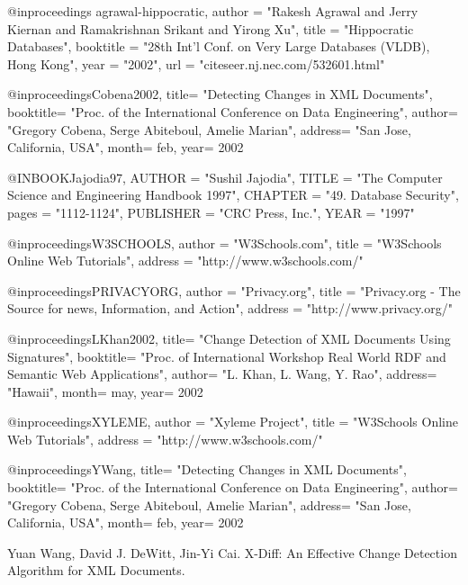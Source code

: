 
%
%

@inproceedings{ agrawal-hippocratic,
  author = "Rakesh Agrawal and Jerry Kiernan and Ramakrishnan Srikant and Yirong Xu",
  title = "Hippocratic Databases",
  booktitle = "28th Int'l Conf. on Very Large Databases (VLDB), Hong Kong",
  year = "2002",
  url = "citeseer.nj.nec.com/532601.html" }


@inproceedings{Cobena2002,
    title=          "Detecting Changes in XML Documents",
    booktitle=      "Proc. of the International Conference on Data Engineering",
    author=         "Gregory Cobena, Serge Abiteboul, Amelie Marian",
    address=        "San Jose, California, USA",
    month=          feb,
    year=           2002
}


@INBOOK{Jajodia97,
  AUTHOR =       "Sushil Jajodia",
  TITLE =        "The Computer Science and Engineering Handbook 1997",
  CHAPTER =      "49. Database Security",
  pages =        "1112-1124",
  PUBLISHER =    "CRC Press, Inc.",
  YEAR =         "1997"
}

@inproceedings{W3SCHOOLS,
    author = "W3Schools.com",
    title = "W3Schools Online Web Tutorials",
    address = "http://www.w3schools.com/"
}

@inproceedings{PRIVACYORG,
    author = "Privacy.org",
    title = "Privacy.org - The Source for news, Information, and Action",
    address = "http://www.privacy.org/"
}


@inproceedings{LKhan2002,
    title=          "Change Detection of XML Documents Using Signatures",
    booktitle=      "Proc. of International Workshop Real World RDF and Semantic Web Applications",
    author=         "L. Khan, L. Wang, Y. Rao",
    address=        "Hawaii",
    month=          may,
    year=           2002
}



@inproceedings{XYLEME,
    author = "Xyleme Project",
    title = "W3Schools Online Web Tutorials",
    address = "http://www.w3schools.com/"
}


@inproceedings{YWang,
    title=          "Detecting Changes in XML Documents",
    booktitle=      "Proc. of the International Conference on Data Engineering",
    author=         "Gregory Cobena, Serge Abiteboul, Amelie Marian",
    address=        "San Jose, California, USA",
    month=          feb,
    year=           2002
}


 {\sc Yuan Wang, David J. DeWitt, Jin-Yi Cai.}
X-Diff: An Effective Change Detection Algorithm for XML Documents.
